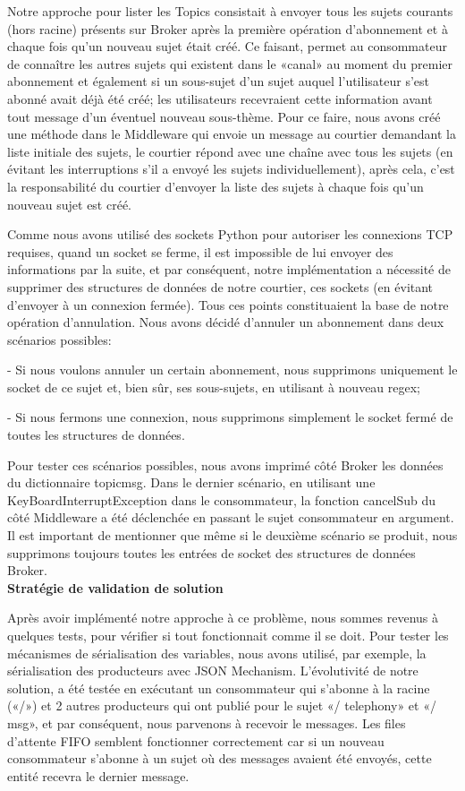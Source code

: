 Notre approche pour lister les Topics consistait à envoyer tous les sujets courants (hors racine) présents sur Broker après la première opération d'abonnement et à chaque fois qu'un nouveau sujet était créé. Ce faisant, permet au consommateur de connaître les autres sujets qui existent dans le «canal» au moment du premier abonnement et également si un sous-sujet d'un sujet auquel l'utilisateur s'est abonné avait déjà été créé; les utilisateurs recevraient cette information avant tout message d'un éventuel nouveau sous-thème. Pour ce faire, nous avons créé une méthode dans le Middleware qui envoie un message au courtier demandant la liste initiale des sujets, le courtier répond avec une chaîne avec tous les sujets (en évitant les interruptions s'il a envoyé les sujets individuellement), après cela, c'est la responsabilité du courtier d'envoyer la liste des sujets à chaque fois qu'un nouveau sujet est créé.

Comme nous avons utilisé des sockets Python pour autoriser les connexions TCP requises, quand un socket se ferme, il est impossible de lui envoyer des informations par la suite, et par conséquent, notre implémentation a nécessité de supprimer des structures de données de notre courtier, ces sockets (en évitant d'envoyer à un connexion fermée). Tous ces points constituaient la base de notre opération d'annulation. Nous avons décidé d'annuler un abonnement dans deux scénarios possibles:

- Si nous voulons annuler un certain abonnement, nous supprimons uniquement le socket de ce sujet et, bien sûr, ses sous-sujets, en utilisant à nouveau regex;

- Si nous fermons une connexion, nous supprimons simplement le socket fermé de toutes les structures de données.

Pour tester ces scénarios possibles, nous avons imprimé côté Broker les données du dictionnaire topicmsg. Dans le dernier scénario, en utilisant une KeyBoardInterruptException dans le consommateur, la fonction cancelSub du côté Middleware a été déclenchée en passant le sujet consommateur en argument. Il est important de mentionner que même si le deuxième scénario se produit, nous supprimons toujours toutes les entrées de socket des structures de données Broker.\\

\textbf{Stratégie de validation de solution}

Après avoir implémenté notre approche à ce problème, nous sommes revenus à quelques tests, pour vérifier si tout fonctionnait comme il se doit. Pour tester les mécanismes de sérialisation des variables, nous avons utilisé, par exemple, la sérialisation des producteurs avec JSON Mechanism. L'évolutivité de notre solution, a été testée en exécutant un consommateur qui s'abonne à la racine («/») et 2 autres producteurs qui ont publié pour le sujet «/ telephony» et «/ msg», et par conséquent, nous parvenons à recevoir le messages. Les files d'attente FIFO semblent fonctionner correctement car si un nouveau consommateur s'abonne à un sujet où des messages avaient été envoyés, cette entité recevra le dernier message.


